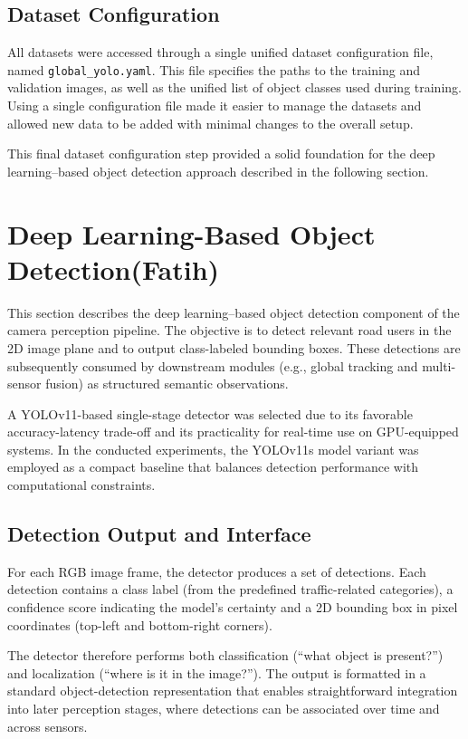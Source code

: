 \documentclass[12pt,a4paper]{report}
\begin{document}
\subsection{Dataset Configuration}
All datasets were accessed through a single unified dataset configuration file, named \texttt{global\_yolo.yaml}. This file specifies the paths to the training and validation images, as well as the unified list of object classes used during training. Using a single configuration file made it easier to manage the datasets and allowed new data to be added with minimal changes to the overall setup.

This final dataset configuration step provided a solid foundation for the deep learning–based object detection approach described in the following section.


\section{Deep Learning-Based Object Detection(Fatih)}
This section describes the deep learning–based object detection component of the camera perception pipeline. The objective is to detect relevant road users in the 2D image plane and to output class-labeled bounding boxes. These detections are subsequently consumed by downstream modules (e.g., global tracking and multi-sensor fusion) as structured semantic observations.

A YOLOv11-based single-stage detector was selected due to its favorable accuracy-latency trade-off and its practicality for real-time use on GPU-equipped systems. In the conducted experiments, the YOLOv11s model variant was employed as a compact baseline that balances detection performance with computational constraints.

\subsection{Detection Output and Interface}
For each RGB image frame, the detector produces a set of detections. Each detection contains a class label (from the predefined traffic-related categories), a confidence score indicating the model’s certainty and a 2D bounding box in pixel coordinates (top-left and bottom-right corners).

The detector therefore performs both classification (“what object is present?”) and localization (“where is it in the image?”). The output is formatted in a standard object-detection representation that enables straightforward integration into later perception stages, where detections can be associated over time and across sensors.
\end{document}
